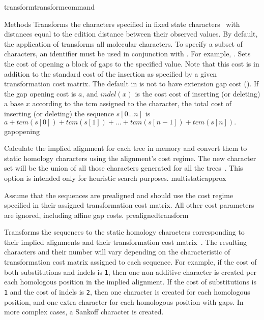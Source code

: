 \begin{command}{transform}{transformcommand}
\begin{arguments}
\begin{argumentgroup}{Methods}
          {Transforms the characters specified in fixed state characters~\cite{wheeler1999a}
          with
          distances equal to the edition distance between their observed values.
          By default, the application of  transforms
          all molecular characters. To specify a subset of characters, an identifier
          must be used in conjunction with . For
          example, .}
          {}
            {Sets the cost of opening a block of gaps to the specified value. Note that
            this cost is in addition to the standard cost of the insertion as
            specified by a given transformation cost matrix.
            The default in \poy is not to have extension
            gap cost (). If the gap
            opening cost is
            $a$, and $indel(x)$ is the cost cost of inserting (or deleting) a
            base $x$ according to the tcm assigned to the character, the total
            cost of inserting (or deleting) the sequence $s[0...n]$ is $a +
            tcm(s[0]) + tcm(s[1]) + ... + tcm(s[n - 1]) + tcm(s[n]).$} 
            {gapopening}

            {Calculate the implied alignment for each tree in memory
            and convert them to static homology characters using the alignment's
            cost regime. The new character set will be the union of all those
            characters generated for all the trees~\cite{wheeler1995a}. This option is intended only
            for heuristic search purposes.}
            {multistaticapprox}

                {Assume that the sequences are prealigned and should use the
                cost regime specified in their assigned transformation cost
                matrix. All other cost parameters are ignored, including affine
                gap costs.}
                {prealignedtransform}
            
            {Transforms the sequences to the static homology characters
            corresponding to their implied alignments and their transformation
            cost matrix~\cite{wheeler2003}. The resulting characters and their number will vary
            depending on the characteristic of transformation cost matrix
            assigned to each sequence. For example, if the cost of both substitutions
            and indels is \texttt{1}, then one non-additive character is created per
            each homologous position in the implied alignment. If the cost of
            substitutions is \texttt{1} and the cost of indels  is \texttt{2}, then
            one character is created for each homologous position, and one extra character for
            each homologous position with gaps. In more complex cases, a Sankoff character is
            created.
            
}
\end{argumentgroup}
\end{arguments}
\end{command}
